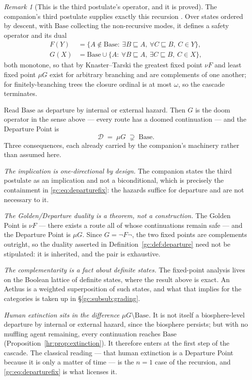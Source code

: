 \documentclass[11pt]{article}
\numberwithin{equation}{section}
\theoremstyle{plain}
\theoremstyle{definition}
\theoremstyle{remark}
\newtheorem{remark}[theorem]{Remark}
\begin{document}
\begin{remark}[This is the third postulate's operator, and it is proved]
\label{gc:rem:thirdpostulate}
The companion's third postulate supplies exactly this recursion
\cite{Aethus}. Over states ordered by descent, with $\mathrm{Base}$
collecting the non-recursive modes, it defines a safety operator and
its dual
\begin{align*}
F(Y)&=\bigl\{A\notin\mathrm{Base}:\ \exists B\sqsubseteq A,\
\forall C\sqsubseteq B,\ C\in Y\bigr\},\\
G(X)&=\mathrm{Base}\cup\bigl\{A:\ \forall B\sqsubseteq A,\
\exists C\sqsubseteq B,\ C\in X\bigr\},
\end{align*}
both monotone, so that by Knaster--Tarski the greatest fixed point
$\nu F$ and least fixed point $\mu G$ exist for arbitrary branching and
are complements of one another; for finitely-branching trees the
closure ordinal is at most $\omega$, so the cascade terminates.

Read $\mathrm{Base}$ as departure by internal or external hazard.
Then $G$ is the doom operator in the sense above --- every route has a
doomed continuation --- and the Departure Point is
\begin{equation}\label{gc:eq:departurefix}
\mathcal{D}\;=\;\mu G\;\supsetneq\;\mathrm{Base}.
\end{equation}
Three consequences, each already carried by the companion's
machinery rather than assumed here.

\emph{The implication is one-directional by design.} The companion
states the third postulate as an implication and not a biconditional,
which is precisely the containment in \eqref{gc:eq:departurefix}: the
hazards suffice for departure and are not necessary to it.

\emph{The Golden/Departure duality is a theorem, not a construction.}
The Golden Point is $\nu F$ --- there exists a route all of whose
continuations remain safe --- and the Departure Point is $\mu G$. Since
$G=\neg F\neg$, the two fixed points are complements outright, so the
duality asserted in Definition~\ref{gc:def:departure} need not be
stipulated: it is inherited, and the pair is exhaustive.

\emph{The complementarity is a fact about definite states.} The
fixed-point analysis lives on the Boolean lattice of definite states,
where the result above is exact. An Aethus is a weighted superposition
of such states, and what that implies for the categories is taken up in
\S\ref{gc:subsub:grading}.

\emph{Human extinction sits in the difference
$\mu G\setminus\mathrm{Base}$.} It is not itself a biosphere-level
departure by internal or external hazard,
since the biosphere persists; but with no muffling agent remaining,
every continuation reaches $\mathrm{Base}$
(Proposition~\ref{hr:prop:extinction}). It therefore enters at the
first step of the cascade. The classical reading --- that human
extinction is a Departure Point because it is only a matter of time ---
is the $n=1$ case of the recursion, and \eqref{gc:eq:departurefix} is
what licenses it.
\end{remark}
\end{document}

